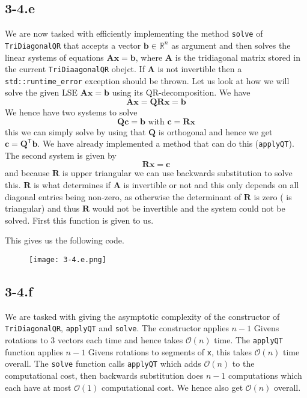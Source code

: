 \documentclass{article}
\begin{document}
\subsection*{3-4.e}
We are now tasked with efficiently implementing the method \verb|solve| of \verb|TriDiagonalQR| that accepts a vector $\mathbf{b}\in \mathbb{R}^{n}$ as argument and then solves the linear systems of equations $\mathbf{A}\mathbf{x}=\mathbf{b}$, where $\mathbf{A}$ is the tridiagonal matrix stored in the current \verb|TriDiaagonalQR| obejct. If $\mathbf{A}$ is not invertible then a \verb|std::runtime_error| exception should be thrown. Let us look at how we will solve the given LSE $\mathbf{A}\mathbf{x} = \mathbf{b}$ using its QR-decomposition. We have
\begin{equation*}
    \mathbf{A}\mathbf{x} = \mathbf{Q}\mathbf{R}\mathbf{x} = \mathbf{b}
\end{equation*}
We hence have two systems to solve
\begin{equation*}
    \mathbf{Q}\mathbf{c} = \mathbf{b} \text{ with } \mathbf{c} = \mathbf{R}\mathbf{x}
\end{equation*}
this we can simply solve by using that $\mathbf{Q}$ is orthogonal and hence we get $\mathbf{c} = \mathbf{Q}^{\mathsf{T}}\mathbf{b}$. We have already implemented a method that can do this (\verb|applyQT|). The second system is given by
\begin{equation*}
    \mathbf{R}\mathbf{x} = \mathbf{c}
\end{equation*}
and because $\mathbf{R}$ is upper triangular we can use backwards substitution to solve this. $\mathbf{R}$ is what determines if $\mathbf{A}$ is invertible or not and this only depends on all diagonal entries being non-zero, as otherwise the determinant of $\mathbf{R}$ is zero ( is triangular) and thus $\mathbf{R}$ would not be invertible and the system could not be solved. First this function is given to us.

\pagebreak

\noindent This gives us the following code.

\begin{figure}[!hbt]
    \centering
\texttt{[image: 3-4.e.png]}
\end{figure}
\subsection*{3-4.f}
We are tasked with giving the asymptotic complexity of the constructor of \verb|TriDiagonalQR|, \verb|applyQT| and \verb|solve|. The constructor applies $n-1$ Givens rotations to $3$ vectors each time and hence takes $\mathcal{O}\left(n\right)$ time. The \verb|applyQT| function applies $n-1$ Givens rotations to segments of \verb|x|, this takes $\mathcal{O}\left(n\right)$ time overall. The \verb|solve| function calls \verb|applyQT| which adds $\mathcal{O}\left(n\right)$ to the computational cost, then backwards substitution does $n-1$ computations which each have at most $\mathcal{O}\left(1\right)$ computational cost. We hence also get $\mathcal{O}\left(n\right)$ overall.
\end{document}
